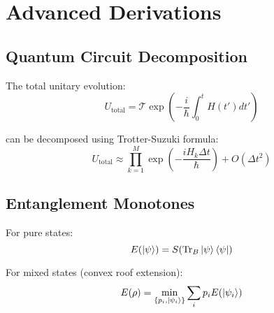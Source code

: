\documentclass[12pt]{article}
\begin{document}
\section{Advanced Derivations}

\subsection{Quantum Circuit Decomposition}
The total unitary evolution:
\begin{equation}
    U_{\text{total}} = \mathcal{T}\exp\left(-\frac{i}{\hbar}\int_0^t H(t')dt'\right)
\end{equation}

can be decomposed using Trotter-Suzuki formula:
\begin{equation}
    U_{\text{total}} \approx \prod_{k=1}^M \exp\left(-\frac{iH_k\Delta t}{\hbar}\right) + O(\Delta t^2)
\end{equation}

\subsection{Entanglement Monotones}
For pure states:
\begin{equation}
    E(\ket{\psi}) = S(\text{Tr}_B\ket{\psi}\bra{\psi})
\end{equation}

For mixed states (convex roof extension):
\begin{equation}
    E(\rho) = \min_{\{p_i,\ket{\psi_i}\}} \sum_i p_i E(\ket{\psi_i})
\end{equation}
\end{document}
